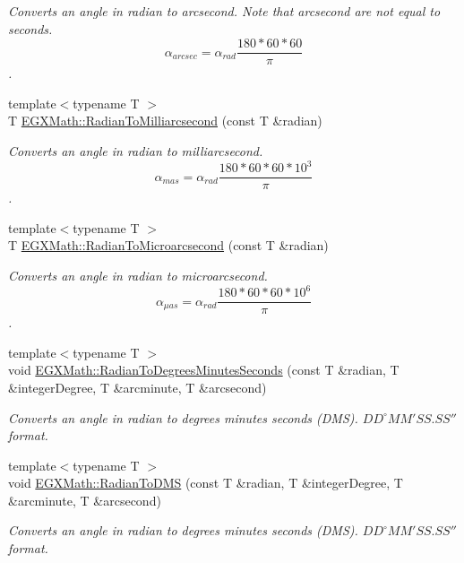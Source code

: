\begin{DoxyCompactItemize}
\begin{DoxyCompactList}\small\item\em Converts an angle in radian to arcsecond. Note that arcsecond are not equal to seconds. \[\alpha_{arcsec}=\alpha_{rad}\frac{180 * 60 * 60}{\pi}\]. \end{DoxyCompactList}\item 
{\footnotesize template$<$typename T $>$ }\\T \mbox{\hyperlink{group___e_g_x_math-_angle_conversions-_radian_ga84fbb494a455cfeb30be62776f96c9a9}{E\+G\+X\+Math\+::\+Radian\+To\+Milliarcsecond}} (const T \&radian)
\begin{DoxyCompactList}\small\item\em Converts an angle in radian to milliarcsecond. \[\alpha_{mas}=\alpha_{rad}\frac{180 * 60 * 60 * 10^3}{\pi}\]. \end{DoxyCompactList}\item 
{\footnotesize template$<$typename T $>$ }\\T \mbox{\hyperlink{group___e_g_x_math-_angle_conversions-_radian_ga3a515ca2838a305fa40750763f546a86}{E\+G\+X\+Math\+::\+Radian\+To\+Microarcsecond}} (const T \&radian)
\begin{DoxyCompactList}\small\item\em Converts an angle in radian to microarcsecond. \[\alpha_{\mu as}=\alpha_{rad}\frac{180 * 60 * 60 * 10^6}{\pi}\]. \end{DoxyCompactList}\item 
{\footnotesize template$<$typename T $>$ }\\void \mbox{\hyperlink{group___e_g_x_math-_angle_conversions-_radian_gadae98c255924fdc8b232b6539eae81a9}{E\+G\+X\+Math\+::\+Radian\+To\+Degrees\+Minutes\+Seconds}} (const T \&radian, T \&integer\+Degree, T \&arcminute, T \&arcsecond)
\begin{DoxyCompactList}\small\item\em Converts an angle in radian to degrees minutes seconds (D\+MS). ${DD}^{\circ}{MM}'{SS.SS}''$ format. \end{DoxyCompactList}\item 
{\footnotesize template$<$typename T $>$ }\\void \mbox{\hyperlink{group___e_g_x_math-_angle_conversions-_radian_gaf80be0c5c65ccaa5544a08a7754f3575}{E\+G\+X\+Math\+::\+Radian\+To\+D\+MS}} (const T \&radian, T \&integer\+Degree, T \&arcminute, T \&arcsecond)
\begin{DoxyCompactList}\small\item\em Converts an angle in radian to degrees minutes seconds (D\+MS). ${DD}^{\circ}{MM}'{SS.SS}''$ format. \end{DoxyCompactList}\item 

\end{DoxyCompactItemize}
